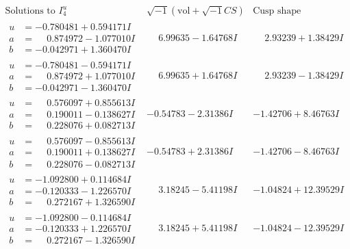 \documentclass[1p]{elsarticle_modified}
\theoremstyle{definition}
\newcommand{\I}{\sqrt{-1}}
\begin{document}
$$\begin{array}{c|c|c}  
\text{Solutions to }I^u_{4}& \I (\text{vol} + \sqrt{-1}CS) & \text{Cusp shape}\\
 \hline 
\begin{aligned}
u &= -0.780481 + 0.594171 I \\
a &= \phantom{-}0.874972 - 1.077010 I \\
b &= -0.042971 + 1.360470 I\end{aligned}
 & \phantom{-}6.99635 - 1.64768 I & \phantom{-}2.93239 + 1.38429 I \\ \hline\begin{aligned}
u &= -0.780481 - 0.594171 I \\
a &= \phantom{-}0.874972 + 1.077010 I \\
b &= -0.042971 - 1.360470 I\end{aligned}
 & \phantom{-}6.99635 + 1.64768 I & \phantom{-}2.93239 - 1.38429 I \\ \hline\begin{aligned}
u &= \phantom{-}0.576097 + 0.855613 I \\
a &= \phantom{-}0.190011 - 0.138627 I \\
b &= \phantom{-}0.228076 + 0.082713 I\end{aligned}
 & -0.54783 - 2.31386 I & -1.42706 + 8.46763 I \\ \hline\begin{aligned}
u &= \phantom{-}0.576097 - 0.855613 I \\
a &= \phantom{-}0.190011 + 0.138627 I \\
b &= \phantom{-}0.228076 - 0.082713 I\end{aligned}
 & -0.54783 + 2.31386 I & -1.42706 - 8.46763 I \\ \hline\begin{aligned}
u &= -1.092800 + 0.114684 I \\
a &= -0.120333 - 1.226570 I \\
b &= \phantom{-}0.272167 + 1.326590 I\end{aligned}
 & \phantom{-}3.18245 - 5.41198 I & -1.04824 + 12.39529 I \\ \hline\begin{aligned}
u &= -1.092800 - 0.114684 I \\
a &= -0.120333 + 1.226570 I \\
b &= \phantom{-}0.272167 - 1.326590 I\end{aligned}
 & \phantom{-}3.18245 + 5.41198 I & -1.04824 - 12.39529 I \\ \hline\begin{aligned}

\end{aligned}
\end{array}$$
\end{document}
